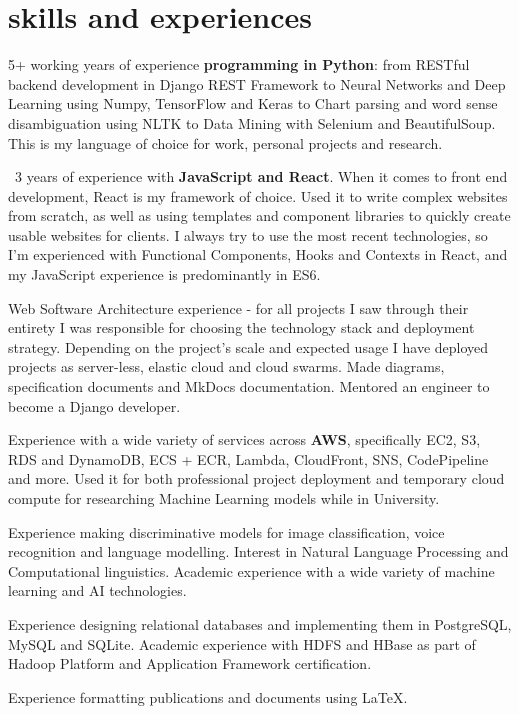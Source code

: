 \documentclass[]{cv-roald}
\begin{document}
\section*{skills and experiences}
\begin{tabitemize}
    \item 5+ working years of experience \textbf{programming in Python}: from RESTful backend development in Django REST Framework to Neural Networks and Deep Learning using Numpy, TensorFlow and Keras to Chart parsing and word sense disambiguation using NLTK to Data Mining with Selenium and BeautifulSoup. This is my language of choice for work, personal projects and research.
    \item ~3 years of experience with \textbf{JavaScript and React}. When it comes to front end development, React is my framework of choice. Used it to write complex websites from scratch, as well as using templates and component libraries to quickly create usable websites for clients. I always try to use the most recent technologies, so I'm experienced with Functional Components, Hooks and Contexts in React, and my JavaScript experience is predominantly in ES6.
    \item Web Software Architecture experience - for all projects I saw through their entirety I was responsible for choosing the technology stack and deployment strategy. Depending on the project's scale and expected usage I have deployed projects as server-less, elastic cloud and cloud swarms. Made diagrams, specification documents and MkDocs documentation. Mentored an engineer to become a Django developer.
    \item Experience with a wide variety of services across \textbf{AWS}, specifically EC2, S3, RDS and DynamoDB, ECS + ECR, Lambda, CloudFront, SNS, CodePipeline and more. Used it for both professional project deployment and temporary cloud compute for researching Machine Learning models while in University.
    \item Experience making discriminative models for image classification, voice recognition and language modelling. Interest in Natural Language Processing and Computational linguistics. Academic experience with a wide variety of machine learning and AI technologies.
    \item Experience designing relational databases and implementing them in PostgreSQL, MySQL and SQLite. Academic experience with HDFS and HBase as part of Hadoop Platform and Application Framework certification.
    \item Experience formatting publications and documents using \LaTeX. 

\end{tabitemize}
\end{document}
